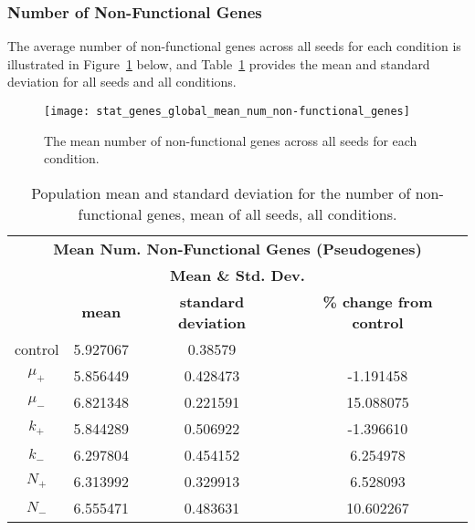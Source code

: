 \subsubsection{Number of Non-Functional Genes}\label{results:number_non-functional_genes}
The average number of non-functional genes across all seeds for each condition is illustrated in Figure~\ref{fig:mean_num_non-functional_genes} below, and Table~\ref{table:non-functional_genes_mean_std_dev} provides the mean and standard deviation for all seeds and all conditions.  

\begin{figure}[H]
	\centering
	\texttt{[image: stat\_genes\_global\_mean\_num\_non-functional\_genes]}
	\caption[Mean number of non-functional genes]{The mean number of non-functional genes across all seeds for each condition.}
	\label{fig:mean_num_non-functional_genes}
\end{figure}


\begin{table}[h]
	\centering
	\begin{tabular}{|c|c|c|c|}
		\hline
		\multicolumn{4}{c}{\Large \textbf{Mean Num. Non-Functional Genes (Pseudogenes)}} \\
		\multicolumn{4}{c}{\Large \textbf{Mean \& Std. Dev.}} \\
		\hline
		& \textbf{mean} & \textbf{standard deviation} & \textbf{\% change from control} \\
		\hline
		control & 5.927067 & 0.38579 & \textemdash \\ 
		\hline
		$\mu_+$ & 5.856449 & 0.428473 & -1.191458 \\ 
		\hline
		$\mu_-$ & 6.821348 & 0.221591 & 15.088075 \\ 
		\hline
		$k_+$ & 5.844289 & 0.506922 & -1.396610 \\ 
		\hline
		$k_-$ & 6.297804 & 0.454152 & 6.254978 \\ 
		\hline
		$N_+$ & 6.313992 & 0.329913 & 6.528093 \\ 
		\hline
		$N_-$ & 6.555471 & 0.483631 & 10.602267 \\ 
		\hline
	\end{tabular}
	\caption[Number of Non-functional Genes - Mean \& St. Dev.]{Population mean and standard deviation for the number of non-functional genes, mean of all seeds, all conditions.}
	\label{table:non-functional_genes_mean_std_dev}
\end{table}

